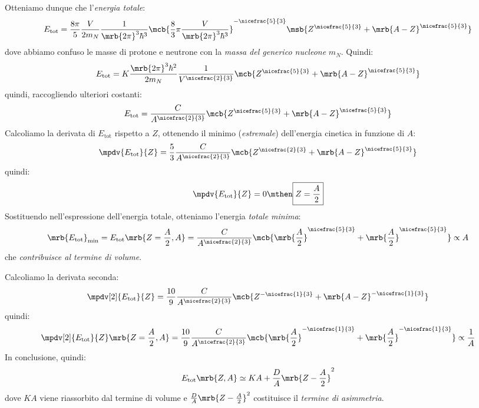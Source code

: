 Otteniamo dunque che l'\textit{energia totale}:
\begin{equation}
  E _\text{tot} = \frac{8 \pi}{5} \frac{V}{2 m_N} \frac{1}{\mrb{2 \pi}^{3}
  \hbar^3} \mcb{\frac{8}{3} \pi \frac{V}{\mrb{2 \pi}^{3}
  \hbar^3}}^{-\nicefrac{5}{3}} \msb{Z ^{\nicefrac{5}{3}} + \mrb{A - Z}
  ^{\nicefrac{5}{3}}}
\end{equation}
dove abbiamo confuso le masse di protone e neutrone con la \textit{massa del
generico nucleone} $m_N$. Quindi:
\begin{equation}
  E _\text{tot} = K \frac{\mrb{2 \pi}^{3} \hbar^2}{2 m_N} \frac{1}{V
  ^{\nicefrac{2}{3}}} \mcb{Z ^{\nicefrac{5}{3}} + \mrb{A -
  Z}^{\nicefrac{5}{3}}}
\end{equation}
quindi, raccogliendo ulteriori costanti:
\begin{equation}
  E_\text{tot} = \frac{C}{A ^{\nicefrac{2}{3}}} \mcb{Z ^{\nicefrac{5}{3}} +
  \mrb{A - Z}^{\nicefrac{5}{3}}}
\end{equation}
Calcoliamo la derivata di $E _\text{tot}$ rispetto a $Z$, ottenendo il minimo
(\textit{estremale}) dell'energia cinetica in funzione di $A$:
\begin{equation}
  \mpdv{E _\text{tot}}{Z} = \frac{5}{3} \frac{C}{A ^{\nicefrac{2}{3}}} \mcb{Z
  ^{\nicefrac{2}{3}} + \mrb{A - Z}^{\nicefrac{5}{3}}}
\end{equation}
quindi:
\begin{equation}
  \mpdv{E _\text{tot}}{Z} = 0
  \mthen
  \boxed{
    Z = \frac{A}{2}
  }
\end{equation}
Sostituendo nell'espressione dell'energia totale, otteniamo l'energia
\textit{totale minima}:
\begin{equation}
  \mrb{E _\text{tot}}_\text{min} = E _\text{tot} \mrb{Z = \frac{A}{2}, A} =
  \frac{C}{A ^{\nicefrac{2}{3}}} \mcb{\mrb{\frac{A}{2}}^{\nicefrac{5}{3}} +
  \mrb{\frac{A}{2}} ^{\nicefrac{5}{3}}} \propto A
\end{equation}
che \textit{contribuisce al termine di volume}.

Calcoliamo la derivata seconda:
\begin{equation}
  \mpdv[2]{E _\text{tot}}{Z} = \frac{10}{9} \frac{C}{A ^{\nicefrac{2}{3}}}
  \mcb{Z ^{-\nicefrac{1}{3}} + \mrb{A - Z}^{-\nicefrac{1}{3}}}
\end{equation}
quindi:
\begin{equation}
  \mpdv[2]{E _\text{tot}}{Z} \mrb{Z = \frac{A}{2}, A} =  \frac{10}{9}
  \frac{C}{A ^{\nicefrac{2}{3}}} \mcb{\mrb{\frac{A}{2}}^{-\nicefrac{1}{3}} +
  \mrb{\frac{A}{2}}^{-\nicefrac{1}{3}}} \propto \frac{1}{A}
\end{equation}
In conclusione, quindi:
\begin{equation}
  E _\text{tot} \mrb{Z, A} \simeq KA + \frac{D}{A} \mrb{Z - \frac{A}{2}}^{2}
\end{equation}
dove $KA$ viene riassorbito dal termine di volume e $\frac{D}{A} \mrb{Z -
\frac{A}{2}}^{2}$ costituisce il \textit{termine di asimmetria}.

